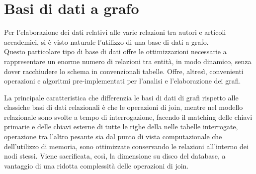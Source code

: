 \documentclass[a4paper,12pt]{article}
\let\oldsection\section
\renewcommand\section{\clearpage\oldsection}
\begin{document}
\section{Basi di dati a grafo}
Per l'elaborazione dei dati relativi alle varie relazioni tra autori e articoli accademici, si è visto naturale l'utilizzo di una base di dati a grafo. \\
Questo particolare tipo di base di dati offre le ottimizzazioni necessarie a rappresentare un enorme numero di relazioni tra entità, in modo dinamico, senza dover racchiudere lo schema in convenzionali tabelle. Offre, altresì, convenienti operazioni e algoritmi pre-implementati per l'analisi e l'elaborazione dei grafi.
\par
La principale caratteristica che differenzia le basi di dati di grafi rispetto alle classiche basi di dati relazionali è che le operazioni di join, mentre nel modello relazionale sono svolte a tempo di interrogazione, facendo il matching delle chiavi primarie e delle chiavi esterne di tutte le righe della nelle tabelle interrogate, operazione tra l'altro pesante sia dal punto di vista computazionale che dell'utilizzo di memoria, sono ottimizzate conservando le relazioni all'interno dei nodi stessi. Viene sacrificata, così, la dimensione su disco del database, a vantaggio di una ridotta complessità delle operazioni di join.
\end{document}
